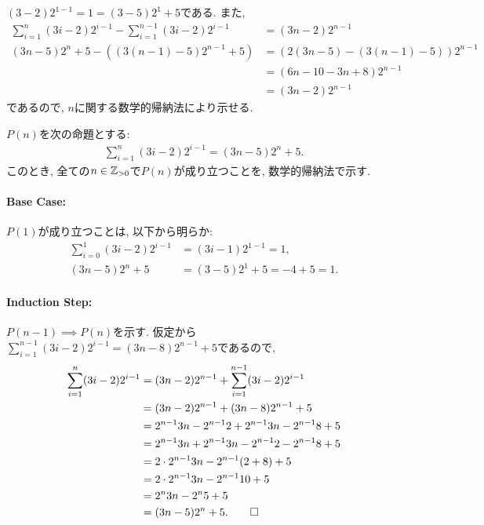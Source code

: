 \begin{proof**}
  $(3-2)2^{1-1}=1=(3-5)2^1+5$である.
  また,
  \begin{align*}
    \sum_{i=1}^n (3i-2)2^{i-1}-\sum_{i=1}^{n-1} (3i-2)2^{i-1}&=(3n-2)2^{n-1}\\
    (3n-5)2^n+5-((3(n-1)-5)2^{n-1}+5)
    &=(2(3n-5)-(3(n-1)-5))2^{n-1}\\
    &=(6n-10-3n+8)2^{n-1}\\
    &=(3n-2)2^{n-1}
  \end{align*}
  であるので,
  $n$に関する数学的帰納法により示せる.
\end{proof**}

\begin{proof*}
  $P(n)$を次の命題とする:
  \begin{align*}
    \sum_{i=1}^n (3i-2)2^{i-1}=(3n-5)2^n+5.
  \end{align*}
  このとき,
  全ての$n\in\mathbb{Z}_{>0}$で$P(n)$が成り立つことを,
  数学的帰納法で示す.

  \paragraph{Base Case:}
  $P(1)$が成り立つことは, 以下から明らか:
  \begin{align*}
    \sum_{i=0}^1 (3i-2)2^{i-1}&=(3i-1)2^{1-1}=1,\\
    (3n-5)2^n+5&=(3-5)2^1+5=-4+5=1.
  \end{align*}

  \paragraph{Induction Step:}
  $P(n-1)\implies P(n)$を示す.
  仮定から$\sum_{i=1}^{n-1} (3i-2)2^{i-1}=(3n-8)2^{n-1}+5$であるので,
  \begin{align*}
    \sum_{i=1}^n (3i-2)2^{i-1}
    &=(3n-2)2^{n-1}+\sum_{i=1}^{n-1} (3i-2)2^{i-1}\\
    &=(3n-2)2^{n-1}+(3n-8)2^{n-1}+5\\
    &=2^{n-1}3n-2^{n-1}2+2^{n-1}3n-2^{n-1}8+5\\
    &=2^{n-1}3n+2^{n-1}3n-2^{n-1}2-2^{n-1}8+5\\
    &=2\cdot 2^{n-1}3n-2^{n-1}(2+8)+5\\
    &=2\cdot 2^{n-1}3n-2^{n-1}10+5\\
    &=2^{n}3n-2^{n}5+5\\
    &=(3n-5)2^n+5
    .\qedhere
  \end{align*}
\end{proof*}
